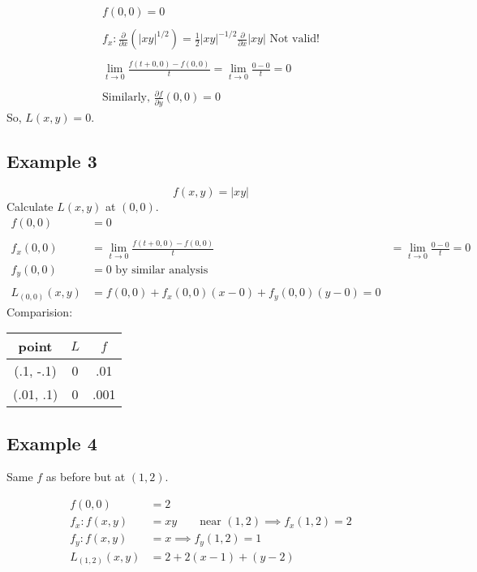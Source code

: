 \documentclass[12pt]{article}
\theoremstyle{definition}
\begin{document}
\begin{align*}
    f(0,0)=0\\\\
    f_x:\frac{\partial}{\partial x}(|xy|^{1/2})=\frac{1}{2}|xy|^{-1/2}\frac{\partial}{\partial x}|xy|\text{ Not valid!}\\\\
    \lim_{t\to 0}\frac{f(t+0, 0)-f(0,0)}{t}=\lim_{t\to 0}\frac{0-0}{t}=0\\\\
    \text{Similarly, }\frac{\partial f}{\partial y}(0,0)=0
\end{align*}
So, $L(x,y)=0$.

\subsection{Example 3}
\[f(x,y)=|xy|\]
Calculate $L(x,y)$ at $(0,0)$.
\begin{align*}
    f(0,0)&=0\\\\
    f_x(0,0)&=\lim_{t\to 0}\frac{f(t+0, 0)-f(0,0)}{t}&=\lim_{t\to 0}\frac{0-0}{t}=0\\
    f_y(0,0)&=0\text{ by similar analysis}\\\\
    L_{(0,0)}(x,y)&=f(0,0)+f_x(0,0)(x-0)+f_y(0,0)(y-0)=0
\end{align*}
Comparision:
\begin{tabular}{c|c|c}
    point & $L$ & $f$\\\hline 
    (.1, -.1) & 0 & .01\\
    (.01, .1) & 0 & .001
\end{tabular}

\subsection{Example 4}
Same $f$ as before but at $(1,2)$.

\begin{align*}
    f(0,0)&=2\\
    f_x:f(x,y)&=xy\qquad\text{near }(1,2)\implies f_x(1,2)=2\\
    f_y:f(x,y)&=x\implies f_y(1,2)=1\\
    L_{(1,2)}(x,y)&=2+2(x-1)+(y-2)
\end{align*}    
\end{document}
